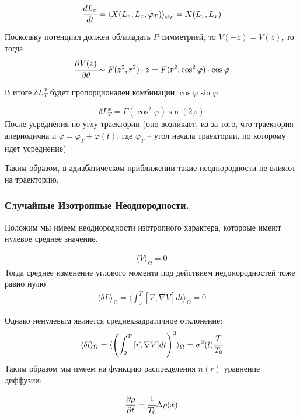 \begin{equation*}
\cfrac{d L_x}{dt} = \langle X(L_z,L_x,\varphi_T)\rangle _{\varphi_T} = X(L_z,L_x)
\end{equation*}

Поскольку потенциал должен облаладать $P$ симметрией, то $V(-z) = V(z)$, то тогда 
\begin{equation*}
\cfrac{\partial V(z)}{\partial \theta} 
\sim F(z^2,r^2)\cdot z =
F(r^2,\cos^2{\varphi}) \cdot \cos{\varphi}
\end{equation*}

В итоге $\delta L^{x}_{T}$ будет пропорционален комбинации $\cos{\varphi} \sin{\varphi}$

\begin{equation*}
\delta L^{x}_{T} = F(\cos^2{\varphi}) \sin(2\varphi)
\end{equation*}
После усреднения по углу траектории (оно возникает, из-за того, что траектория апериодична и $\varphi = \varphi_T + \varphi(t)$, где $\varphi_T$ – угол начала траектории, по которому идет усреднение)

Таким образом, в адиабатическом приближении такие неоднородности не влияют на траекторию.

\subsubsection{Случайные Изотропные Неоднородности.}

Положим мы имеем неоднородности изотропного характера, котороые имеют нулевое среднее значение.

\begin{eqnarray}
	\langle V \rangle_{\Omega} = 0
\end{eqnarray}
Тогда среднее изменение углового момента под действием недонородностей тоже равно нулю
\begin{eqnarray}
	\langle \delta L \rangle_{\Omega} = \langle \int_0^T{[\vec{r},\nabla V] dt} \rangle_{\Omega} = 0
\end{eqnarray}

Однако ненулевым является среднеквадратичное отклонение:
\begin{eqnarray}
	\langle \delta l \rangle_{\Omega} = \langle \left(\int_0^T{[\vec{r},\nabla V] dt} \right)^2\rangle_{\Omega} = \sigma^2(l) \cfrac{T}{T_0}
\end{eqnarray}
Таким образом мы имеем на функцию распределения $n(r)$ уравнение диффузии:

\begin{equation*}
	\frac{\partial \rho}{\partial t} =  \cfrac{1}{T_0} \Delta \rho(x)
\end{equation*} 

